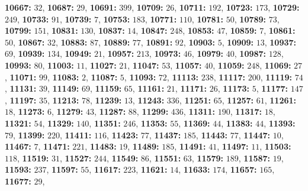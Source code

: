\textsf{\bfseries 10667:} $32$, \textsf{\bfseries 10687:} $29$, \textsf{\bfseries 10691:} $399$, \textsf{\bfseries 10709:} $26$, \textsf{\bfseries 10711:} $192$, \textsf{\bfseries 10723:} $173$, \textsf{\bfseries 10729:} $249$, \textsf{\bfseries 10733:} $91$, \textsf{\bfseries 10739:} $7$, \textsf{\bfseries 10753:} $183$, \textsf{\bfseries 10771:} $110$, \textsf{\bfseries 10781:} $50$, \textsf{\bfseries 10789:} $73$, \textsf{\bfseries 10799:} $151$, \textsf{\bfseries 10831:} $130$, \textsf{\bfseries 10837:} $14$, \textsf{\bfseries 10847:} $248$, \textsf{\bfseries 10853:} $47$, \textsf{\bfseries 10859:} $7$, \textsf{\bfseries 10861:} $50$, \textsf{\bfseries 10867:} $32$, \textsf{\bfseries 10883:} $87$, \textsf{\bfseries 10889:} $77$, \textsf{\bfseries 10891:} $92$, \textsf{\bfseries 10903:} $5$, \textsf{\bfseries 10909:} $13$, \textsf{\bfseries 10937:} $69$, \textsf{\bfseries 10939:} $134$, \textsf{\bfseries 10949:} $21$, \textsf{\bfseries 10957:} $213$, \textsf{\bfseries 10973:} $46$, \textsf{\bfseries 10979:} $40$, \textsf{\bfseries 10987:} $128$, \textsf{\bfseries 10993:} $80$, \textsf{\bfseries 11003:} $11$, \textsf{\bfseries 11027:} $21$, \textsf{\bfseries 11047:} $53$, \textsf{\bfseries 11057:} $40$, \textsf{\bfseries 11059:} $248$, \textsf{\bfseries 11069:} $27$, \textsf{\bfseries 11071:} $99$, \textsf{\bfseries 11083:} $2$, \textsf{\bfseries 11087:} $5$, \textsf{\bfseries 11093:} $72$, \textsf{\bfseries 11113:} $238$, \textsf{\bfseries 11117:} $200$, \textsf{\bfseries 11119:} $74$, \textsf{\bfseries 11131:} $39$, \textsf{\bfseries 11149:} $69$, \textsf{\bfseries 11159:} $65$, \textsf{\bfseries 11161:} $21$, \textsf{\bfseries 11171:} $26$, \textsf{\bfseries 11173:} $5$, \textsf{\bfseries 11177:} $147$, \textsf{\bfseries 11197:} $35$, \textsf{\bfseries 11213:} $78$, \textsf{\bfseries 11239:} $13$, \textsf{\bfseries 11243:} $336$, \textsf{\bfseries 11251:} $65$, \textsf{\bfseries 11257:} $61$, \textsf{\bfseries 11261:} $18$, \textsf{\bfseries 11273:} $6$, \textsf{\bfseries 11279:} $43$, \textsf{\bfseries 11287:} $88$, \textsf{\bfseries 11299:} $436$, \textsf{\bfseries 11311:} $190$, \textsf{\bfseries 11317:} $18$, \textsf{\bfseries 11321:} $54$, \textsf{\bfseries 11329:} $140$, \textsf{\bfseries 11351:} $246$, \textsf{\bfseries 11353:} $55$, \textsf{\bfseries 11369:} $44$, \textsf{\bfseries 11383:} $44$, \textsf{\bfseries 11393:} $79$, \textsf{\bfseries 11399:} $220$, \textsf{\bfseries 11411:} $116$, \textsf{\bfseries 11423:} $77$, \textsf{\bfseries 11437:} $185$, \textsf{\bfseries 11443:} $77$, \textsf{\bfseries 11447:} $10$, \textsf{\bfseries 11467:} $7$, \textsf{\bfseries 11471:} $221$, \textsf{\bfseries 11483:} $19$, \textsf{\bfseries 11489:} $185$, \textsf{\bfseries 11491:} $41$, \textsf{\bfseries 11497:} $11$, \textsf{\bfseries 11503:} $118$, \textsf{\bfseries 11519:} $31$, \textsf{\bfseries 11527:} $244$, \textsf{\bfseries 11549:} $86$, \textsf{\bfseries 11551:} $63$, \textsf{\bfseries 11579:} $189$, \textsf{\bfseries 11587:} $19$, \textsf{\bfseries 11593:} $237$, \textsf{\bfseries 11597:} $55$, \textsf{\bfseries 11617:} $223$, \textsf{\bfseries 11621:} $14$, \textsf{\bfseries 11633:} $174$, \textsf{\bfseries 11657:} $165$, \textsf{\bfseries 11677:} $29$, 
